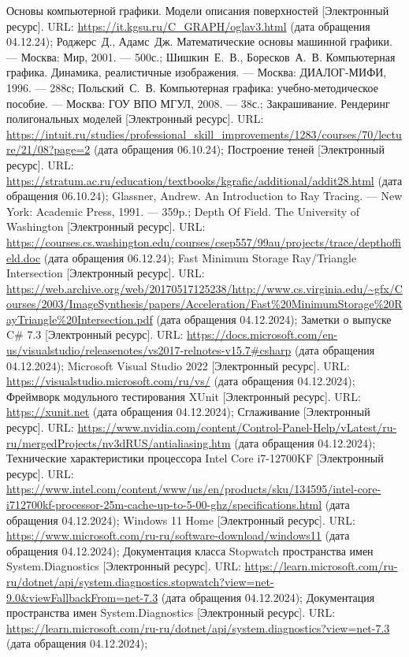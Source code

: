 \begin{thebibliography}{}
	 Основы компьютерной графики. Модели описания поверхностей [Электронный ресурс]. URL: \url{https://it.kgsu.ru/C_GRAPH/oglav3.html} (дата обращения 04.12.24);
	 Роджерс~Д., Адамс~Дж. Математические основы машинной графики. --- Москва: Мир, 2001. --- 500с.;
	 Шишкин~Е.~В., Боресков~А.~В. Компьютерная графика. Динамика, реалистичные изображения. --- Москва: ДИАЛОГ-МИФИ, 1996. --- 288с;
	 Польский~С.~В. Компьютерная графика: учебно-методическое пособие. --- Москва: ГОУ ВПО МГУЛ, 2008. --- 38с.;
	 Закрашивание. Рендеринг полигональных моделей [Электронный ресурс]. URL: \url{https://intuit.ru/studies/professional\_skill\_improvements/1283/courses/70/lecture/21/08?page=2} (дата обращения 06.10.24);
	 Построение теней [Электронный ресурс]. URL: \url{https://stratum.ac.ru/education/textbooks/kgrafic/additional/addit28.html} (дата обращения 06.10.24);
	 Glassner, Andrew. An Introduction to Ray Tracing. --- New York: Academic Press, 1991. --- 359p.;
	 Depth Of Field. The University of Washington [Электронный ресурс]. URL: \url{https://courses.cs.washington.edu/courses/csep557/99au/projects/trace/depthoffield.doc} (дата обращения 06.12.24);
	 Fast Minimum Storage Ray/Triangle Intersection [Электронный ресурс]. URL: \url{https://web.archive.org/web/20170517125238/http://www.cs.virginia.edu/~gfx/Courses/2003/ImageSynthesis/papers/Acceleration/Fast\%20MinimumStorage\%20RayTriangle\%20Intersection.pdf} (дата обращения 04.12.2024);
	 Заметки о выпуске C\# 7.3 [Электронный ресурс]. URL: \url{https://docs.microsoft.com/en-us/visualstudio/releasenotes/vs2017-relnotes-v15.7#csharp} (дата обращения 04.12.2024);
	 Microsoft Visual Studio 2022 [Электронный ресурс]. URL: \url{https://visualstudio.microsoft.com/ru/vs/} (дата обращения 04.12.2024);
	 Фреймворк модульного тестирования XUnit [Электронный ресурс]. URL: \url{https://xunit.net} (дата обращения 04.12.2024);
	 Сглаживание [Электронный ресурс]. URL: \url{https://www.nvidia.com/content/Control-Panel-Help/vLatest/ru-ru/mergedProjects/nv3dRUS/antialiasing.htm} (дата обращения 04.12.2024);
	 Технические характеристики процессора Intel Core i7-12700KF [Электронный ресурс]. URL: \url{https://www.intel.com/content/www/us/en/products/sku/134595/intel-core-i712700kf-processor-25m-cache-up-to-5-00-ghz/specifications.html} (дата обращения 04.12.2024);
	 Windows 11 Home [Электронный ресурс]. URL: \url{https://www.microsoft.com/ru-ru/software-download/windows11} (дата обращения 04.12.2024);
	 Документация класса Stopwatch пространства имен System.Diagnostics [Электронный ресурс]. URL: \url{https://learn.microsoft.com/ru-ru/dotnet/api/system.diagnostics.stopwatch?view=net-9.0&viewFallbackFrom=net-7.3} (дата обращения 04.12.2024);
	 Документация пространства имен System.Diagnostics [Электронный ресурс]. URL: \url{https://learn.microsoft.com/ru-ru/dotnet/api/system.diagnostics?view=net-7.3} (дата обращения 04.12.2024);
\end{thebibliography}
